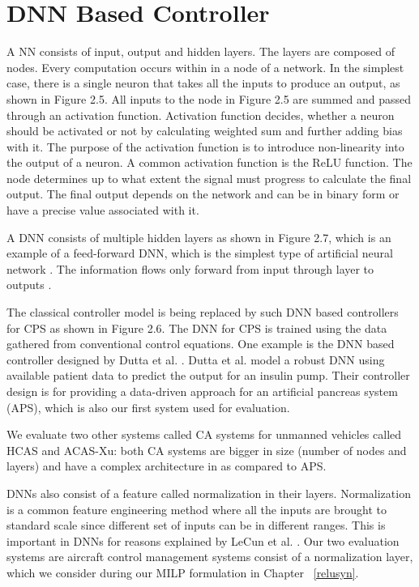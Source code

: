 \section{DNN Based Controller}
\label{apsdnn}


A \ac{NN} consists of input, output and hidden layers. 
The layers are composed of nodes. Every computation occurs within in a node of a network.
In the simplest case, there is a single neuron that takes all the inputs to produce an output, as shown in Figure 2.5. 
All inputs to the node in Figure 2.5 are summed and  passed through an activation function. 
Activation function decides, whether a neuron should be activated or not by calculating weighted sum and further adding bias with it. The purpose of the activation function is to introduce non-linearity into the output of a neuron.
A common activation function is the \ac{ReLU} function. 
The node determines up to what extent the signal must progress to calculate the final output. 
The final output depends on the network and can be in binary form or have a precise value associated with it. 


A \ac{DNN} consists of multiple hidden layers as shown in Figure 2.7, which is an example of a feed-forward \ac{DNN}, which is the simplest type of artificial neural network \cite{feedforward}.
The information flows only forward from input through layer to outputs \cite{Zell}. 

The classical controller model is being replaced by such DNN based controllers for CPS as shown in  Figure 2.6.
The \ac{DNN} for \ac*{CPS} is trained using the data gathered from conventional control equations. 
One example is the DNN based controller designed by Dutta et al. \cite{Dutta_Others__2018__Robust}. 
Dutta et al. model a robust DNN using available patient data to predict the output for an insulin pump.
Their controller design is for providing a data-driven approach for an artificial pancreas system (APS), which is also our first system used for evaluation. 

We evaluate two other systems called \ac{CA} systems for unmanned vehicles \cite{7778055} called \ac{HCAS} and \ac{ACAS-Xu}: both \ac{CA} systems are bigger in size (number of nodes and layers) and have a complex architecture in as compared to \ac{APS}.


\ac{DNN}s also consist of a feature called normalization in their layers.  
Normalization is a common feature engineering method where all the inputs are brought to standard scale since different set of inputs can be in different ranges. 
This is important in \ac{DNN}s for reasons explained by  LeCun et al.  \cite{10.5555/645754.668382}.
Our two evaluation systems are aircraft  control management systems \cite{10.1007/978-3-319-63387-9_5} consist of a normalization layer, 
which we consider during our \ac{MILP} formulation in Chapter ~\ref{relusyn}.

